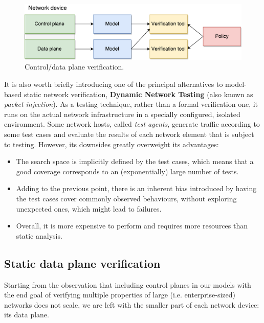 \begin{figure}[h]
  \centering
  \includegraphics[scale=0.5]{src/img/control-data}
  \caption{Control/data plane verification.}
  \label{fig:control-data-verif}
\end{figure}

It is also worth briefly introducing one of the principal alternatives to
model-based static network verification, \textbf{Dynamic Network Testing} (also
known as \emph{packet injection}). As a testing technique, rather than a formal
verification one, it runs on the actual network infrastructure in a specially
configured, isolated environment.  Some network hosts, called \emph{test
agents}, generate traffic according to some test cases and evaluate the results
of each network element that is subject to testing.  However, its downsides
greatly overweight its advantages:

\begin{itemize}
  \item The search space is implicitly defined by the test cases, which means
    that a good coverage corresponds to an (exponentially) large number of
    tests.
  \item Adding to the previous point, there is an inherent bias introduced by
    having the test cases cover commonly observed behaviours, without exploring
    unexpected ones, which might lead to failures.
  \item Overall, it is more expensive to perform and requires more resources
    than static analysis.
\end{itemize}


\subsection{Static data plane verification}\label{sub-sec:static-dp-verif}

Starting from the observation that including control planes in our models with
the end goal of verifying multiple properties of large (i.e.  enterprise-sized)
networks does not scale, we are left with the smaller part of each network
device: its data plane.

